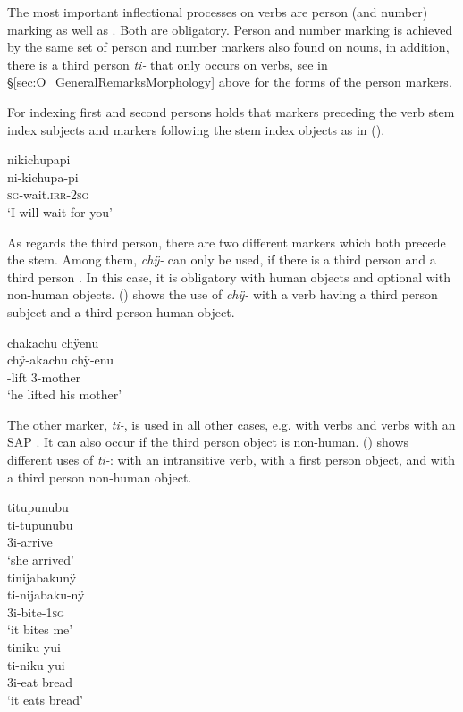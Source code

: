 The most important inflectional processes on verbs are person (and number) marking as well as . Both are obligatory. Person and number marking is achieved by the same set of person and number markers also found on nouns, in addition, there is a third person  \textit{ti-} that only occurs on verbs, see  in §\ref{sec:O_GeneralRemarksMorphology} above for the forms of the person markers.

For indexing first and second persons holds that markers preceding the verb stem index subjects and markers following the stem index objects as in ().

\ea\label{ex:Sketch-PersVerb}
\begingl
\glpreamble nikichupapi\\
\gla ni-kichupa-pi\\
\textsc{sg}-wait.\textsc{irr}-2\textsc{sg}\\
\glft ‘I will wait for you’\\
\endgl
\xe

As regards the third person, there are two different markers which both precede the stem. Among them, \textit{chÿ-} can only be used, if there is a third person  and a third person . In this case, it is obligatory with human objects and optional with non-human objects. () shows the use of \textit{chÿ-} with a verb having a third person subject and a third person human object.

\newpage
\ea\label{ex:Sketch-3transHUM}
\begingl
\glpreamble chakachu chÿenu\\
\gla chÿ-akachu chÿ-enu\\
-lift 3-mother\\
\glft ‘he lifted his mother’\\
\endgl
\xe

The other marker, \textit{ti-}, is used in all other cases, e.g. with  verbs and  verbs with an SAP . It can also occur if the third person object is non-human. () shows different uses of \textit{ti-}: with an intransitive verb, with a first person object, and with a third person non-human object.

\ea\label{ex:Sketch-3i}
  \ea
\begingl
\glpreamble titupunubu\\
\gla ti-tupunubu\\
\glb 3i-arrive\\
\glft ‘she arrived’\\
\endgl
  \ex
\begingl
\glpreamble tinijabakunÿ\\
\gla ti-nijabaku-nÿ\\
\glb 3i-bite-1\textsc{sg}\\
\glft ‘it bites me’\\
\endgl
  \ex
\begingl
\glpreamble tiniku yui\\
\gla ti-niku yui\\
\glb 3i-eat bread\\
\glft ‘it eats bread’\\
\endgl
\z
\xe

